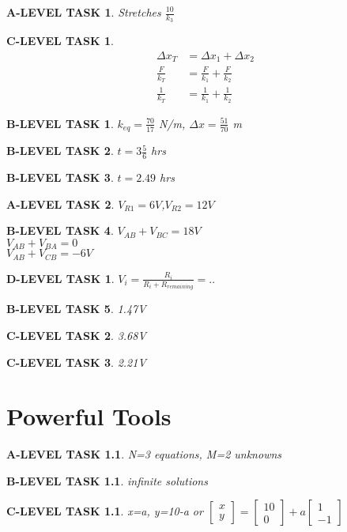 \documentclass{book}
\numberwithin{equation}{section}
\newtheorem{alevel}{A-LEVEL TASK}
\newtheorem{blevel}{B-LEVEL TASK}
\newtheorem{clevel}{C-LEVEL TASK}
\newtheorem{dlevel}{D-LEVEL TASK}
\theoremstyle{definition}
\begin{document}
\begin{alevel} Stretches $\frac{10}{k_3}$\end{alevel}
\begin{clevel} 
\begin{align*}
\Delta x_T&=\Delta x_1+\Delta x_2\\
\frac{F}{k_T}&=\frac{F}{k_1}+\frac{F}{k_2}\\
\frac{1}{k_T}&=\frac{1}{k_1}+\frac{1}{k_2}
\end{align*}
\end{clevel}
\begin{blevel}$k_{eq}=\frac{70}{17}$ N/m, $\Delta x=\frac{51}{70}$ m\end{blevel}

\begin{blevel}$t=3\frac{5}{6}$ hrs\end{blevel}
\begin{blevel}$t=2.49$ hrs\end{blevel}


\begin{alevel}$V_{R1}=6V$,$V_{R2}=12V$\end{alevel}
\begin{blevel}$V_{AB}+V_{BC}=18V$\\
$V_{AB}+V_{BA}=0$\\
$V_{AB}+V_{CB}=-6V$
\end{blevel}
\begin{dlevel}$V_i=\frac{R_i}{R_i+R_{remaining}}=..$\end{dlevel}
\begin{blevel}1.47V\end{blevel}
\begin{clevel}3.68V\end{clevel}
\begin{clevel}2.21V\end{clevel}

\setcounter{alevel}{0} \setcounter{blevel}{0} \setcounter{clevel}{0} \setcounter{dlevel}{0}
\chapter{Powerful Tools}

\begin{alevel}N=3 equations, M=2 unknowns\end{alevel}
\begin{blevel}infinite solutions\end{blevel}
\begin{clevel}x=a, y=10-a or 
$\left[ \begin{matrix}x\\y \end{matrix}\right]=
\left[ \begin{matrix}10\\0 \end{matrix}\right]+
a\left[ \begin{matrix}1\\-1 \end{matrix}\right]$
\end{clevel}
\end{document}
